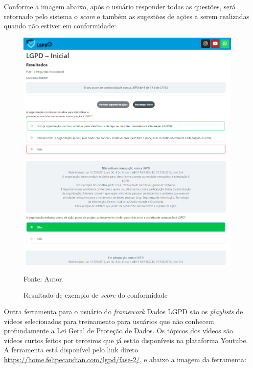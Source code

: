 \documentclass[
	12pt,				%
	openright,			%
	oneside,			%
	a4paper,			%
	english,			%
	french,				%
	spanish,			%
	brazil,				%
	]{abntex2}
\begin{document}
Conforme a imagem abaixo, após o usuário responder todas as questões, será retornado pelo sistema o \textit{score} e também as sugestões de ações a serem realizadas quando não estiver em conformidade:
\begin{figure}[ht]
    \centering
    \caption{Resultado de exemplo de \textit{score} do conformidade }
    \includegraphics[width=6.8in]{Images/resultado.png}
    \label{fig: resultado}
    
    \centering \small Fonte: Autor.
\end{figure}

\pagebreak

Outra ferramenta para o usuário do \textit{framework} Dados LGPD são os \textit{playlists} de vídeos selecionados para treinamento para usuários que não conhecem profundamente a Lei Geral de Proteção de Dados. Os tópicos dos vídeos são vídeos curtos feitos por terceiros que já estão disponíveis na plataforma Youtube.
A ferramenta está disponível pelo link direto \url{https://home.felipecandian.com/lgpd/fase-2/}, e abaixo a imagem da ferramenta:
\end{document}
